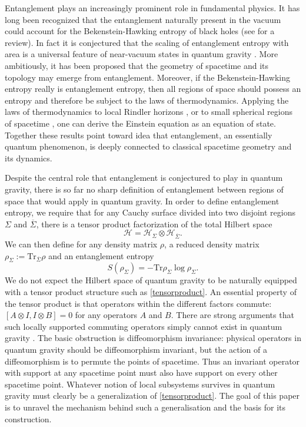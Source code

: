 \documentclass[a4paper,11pt]{article}
\newcommand{\Tr}{\mbox{Tr}}
\begin{document}
Entanglement plays an increasingly prominent role in fundamental physics.
It has long been recognized that the entanglement naturally present in the vacuum could account for the Bekenstein-Hawking entropy of black holes \cite{Sorkin1983,Bombelli1986,Srednicki1993} (see \cite{Solodukhin2011} for a review).
In fact it is conjectured that the scaling of entanglement entropy with area is a universal feature of near-vacuum states in quantum gravity \cite{Bianchi:2012ev}. 
More ambitiously, it has been proposed that the geometry of spacetime \cite{VanRaamsdonk2010} and its topology \cite{Maldacena2013} may emerge from entanglement.
Moreover, if the Bekenstein-Hawking entropy really is entanglement entropy, then all regions of space should possess an entropy and therefore be subject to the laws of thermodynamics.
Applying the laws of thermodynamics to local Rindler horizons \cite{Jacobson1995}, or to small spherical regions of spacetime \cite{Jacobson:2015hqa}, one can derive the Einstein equation as an equation of state.
Together these results point toward idea that entanglement, an essentially quantum phenomenon, is deeply connected to classical spacetime geometry and its dynamics.


Despite the central role that entanglement is conjectured to play in quantum gravity, there is so far no sharp definition of entanglement between regions of space that would apply in quantum gravity.
In order to define entanglement entropy, we require that for any Cauchy surface divided into two disjoint regions $\Sigma$ and $\overline \Sigma$, there is a tensor product factorization of the total Hilbert space
\begin{equation} \label{tensorproduct}
\mathcal{H} = \mathcal{H}_\Sigma \otimes \mathcal{H}_{\overline \Sigma}.
\end{equation}
We can then define for any density matrix $\rho$, a reduced density matrix $\rho_\Sigma := \Tr_{\overline \Sigma} \rho$ and an entanglement entropy
\begin{equation}
S(\rho_\Sigma) = - \Tr \rho_\Sigma \log \rho_\Sigma.
\end{equation}
We do not expect the Hilbert space of quantum gravity to be naturally equipped with a tensor product structure such as \eqref{tensorproduct}.
An essential property of the tensor product is that operators within the different factors commute: $[A \otimes I, I \otimes B] = 0$ for any operators $A$ and $B$.
There are strong arguments that such locally supported commuting operators simply cannot exist in quantum gravity \cite{Giddings:2005id,Giddings:2015lla}.
The basic obstruction is diffeomorphism invariance: physical operators in quantum gravity should be diffeomorphism invariant, but the action of a diffeomorphism is to permute the points of spacetime. 
Thus an invariant operator with support at any spacetime point must also have support on every other spacetime point.
Whatever notion of local subsystems survives in quantum gravity must clearly be a generalization of \eqref{tensorproduct}. 
The goal of this paper is to unravel the mechanism behind such a generalisation and the basis for its construction.
\end{document}
